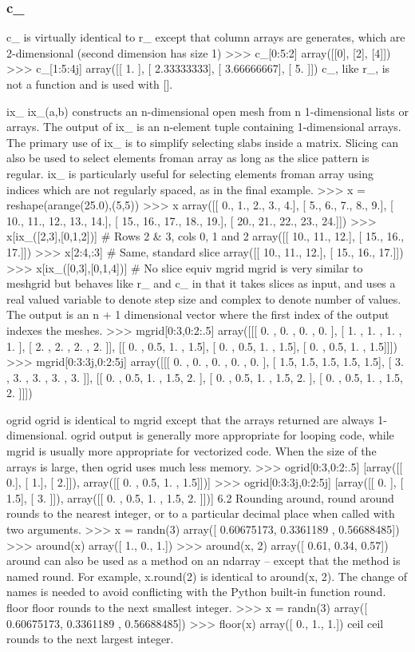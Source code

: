 {\subsubsection{c_}
c\_ is virtually identical to r\_ except that column arrays are generates, which are 2-dimensional (second
dimension has size 1)
>>> c_[0:5:2]
array([[0],
[2],
[4]])
>>> c_[1:5:4j]
array([[ 1. ],
[ 2.33333333],
[ 3.66666667],
[ 5. ]])
c\_, like r\_, is not a function and is used with [].

ix_
ix_(a,b) constructs an n-dimensional open mesh from n 1-dimensional lists or arrays. The output of
ix_ is an n-element tuple containing 1-dimensional arrays. The primary use of ix_ is to simplify selecting
slabs inside a matrix. Slicing can also be used to select elements froman array as long as the slice pattern is
regular. ix_ is particularly useful for selecting elements froman array using indices which are not regularly
spaced, as in the final example.
>>> x = reshape(arange(25.0),(5,5))
>>> x
array([[ 0., 1., 2., 3., 4.],
[ 5., 6., 7., 8., 9.],
[ 10., 11., 12., 13., 14.],
[ 15., 16., 17., 18., 19.],
[ 20., 21., 22., 23., 24.]])
>>> x[ix_([2,3],[0,1,2])] # Rows 2 & 3, cols 0, 1 and 2
array([[ 10., 11., 12.],
[ 15., 16., 17.]])
>>> x[2:4,:3] # Same, standard slice
array([[ 10., 11., 12.],
[ 15., 16., 17.]])
>>> x[ix_([0,3],[0,1,4])] # No slice equiv
mgrid
mgrid is very similar to meshgrid but behaves like r_ and c_ in that it takes slices as input, and uses a
real valued variable to denote step size and complex to denote number of values. The output is an n + 1
dimensional vector where the first index of the output indexes the meshes.
>>> mgrid[0:3,0:2:.5]
array([[[ 0. , 0. , 0. , 0. ],
[ 1. , 1. , 1. , 1. ],
[ 2. , 2. , 2. , 2. ]],
[[ 0. , 0.5, 1. , 1.5],
[ 0. , 0.5, 1. , 1.5],
[ 0. , 0.5, 1. , 1.5]]])
>>> mgrid[0:3:3j,0:2:5j]
array([[[ 0. , 0. , 0. , 0. , 0. ],
[ 1.5, 1.5, 1.5, 1.5, 1.5],
[ 3. , 3. , 3. , 3. , 3. ]],
[[ 0. , 0.5, 1. , 1.5, 2. ],
[ 0. , 0.5, 1. , 1.5, 2. ],
[ 0. , 0.5, 1. , 1.5, 2. ]]])


ogrid
ogrid is identical to mgrid except that the arrays returned are always 1-dimensional. ogrid output is generally
more appropriate for looping code, while mgrid is usually more appropriate for vectorized code.
When the size of the arrays is large, then ogrid uses much less memory.
>>> ogrid[0:3,0:2:.5]
[array([[ 0.],
[ 1.],
[ 2.]]), array([[ 0. , 0.5, 1. , 1.5]])]
>>> ogrid[0:3:3j,0:2:5j]
[array([[ 0. ],
[ 1.5],
[ 3. ]]),
array([[ 0. , 0.5, 1. , 1.5, 2. ]])]
6.2 Rounding
around, round
around rounds to the nearest integer, or to a particular decimal place when called with two arguments.
>>> x = randn(3)
array([ 0.60675173, 0.3361189
, 0.56688485])
>>> around(x)
array([ 1., 0., 1.])
>>> around(x, 2)
array([ 0.61, 0.34,
0.57])
around can also be used as a method on an ndarray – except that the method is named round. For example,
x.round(2) is identical to around(x, 2). The change of names is needed to avoid conflicting with the
Python built-in function round.
floor
floor rounds to the next smallest integer.
>>> x = randn(3)
array([ 0.60675173, 0.3361189
, 0.56688485])
>>> floor(x)
array([ 0., 1.,
1.])
ceil
ceil rounds to the next largest integer.

}
